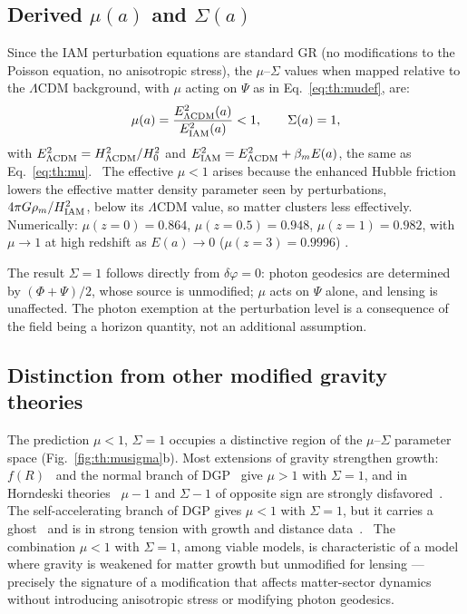 \subsection{Derived $\mu(a)$ and $\Sigma(a)$}
Since the IAM perturbation equations are standard GR (no modifications to the Poisson equation, no anisotropic stress), the $\mu$--$\Sigma$ values when
mapped relative to the $\Lambda$CDM background, with $\mu$ acting on $\Psi$ as in Eq.~\eqref{eq:th:mudef}, are:
\begin{equation}\mu(a)=\frac{E^2_{\Lambda\rm CDM}(a)}{E^2_{\rm IAM}(a)}<1,\qquad\Sigma(a)=1,\label{eq:th:mu2}\end{equation}
with $E^2_{\Lambda\rm CDM}=H^2_{\Lambda\rm CDM}/H_0^2$ and $E^2_{\rm IAM}=E^2_{\Lambda\rm CDM}+\beta_mE(a)$, the same as Eq.~\eqref{eq:th:mu}. \derived\ The effective $\mu<1$
arises because the enhanced Hubble friction lowers the effective matter density parameter seen by perturbations, $4\pi G\rho_m/H^2_{\rm IAM}$, below its
$\Lambda$CDM value, so matter clusters less effectively. Numerically: $\mu(z{=}0)=0.864$, $\mu(z{=}0.5)=0.948$, $\mu(z{=}1)=0.982$, with $\mu\to1$ at
high redshift as $E(a)\to0$ ($\mu(z{=}3)=0.9996$) \calc.

The result $\Sigma=1$ follows directly from $\delta\varphi=0$: photon geodesics are determined by $(\Phi+\Psi)/2$, whose source is
unmodified; $\mu$ acts on $\Psi$ alone, and lensing is unaffected. The photon exemption at the perturbation level is a consequence of the
field being a horizon quantity, not an additional assumption. \derived

\subsection{Distinction from other modified gravity theories}
The prediction $\mu<1$, $\Sigma=1$ occupies a distinctive region of the $\mu$--$\Sigma$ parameter space (Fig.~\ref{fig:th:musigma}b). Most extensions of
gravity strengthen growth: $f(R)$~\cite{PogosianSilvestri2008} and the normal branch of DGP~\cite{DGP2000,KoyamaMaartens2006} give $\mu>1$ with $\Sigma=1$, and in
Horndeski theories~\cite{Horndeski1974} $\mu-1$ and $\Sigma-1$ of opposite sign are strongly disfavored~\cite{PogosianSilvestri2016}. The self-accelerating branch of
DGP gives $\mu<1$ with $\Sigma=1$, but it carries a ghost~\cite{Koyama2007} and is in strong tension with growth and distance data~\cite{Fang2008}. \observed\ The
combination $\mu<1$ with $\Sigma=1$, among viable models, is characteristic of a model where gravity is weakened for matter growth but unmodified for
lensing --- precisely the signature of a modification that affects matter-sector dynamics without introducing anisotropic stress or modifying photon
geodesics.

